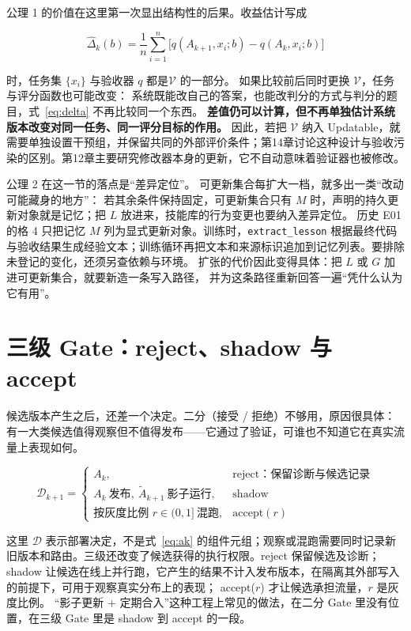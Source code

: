 公理 1 的价值在这里第一次显出结构性的后果。收益估计写成

\begin{equation}
\widehat\Delta_k(b)=\frac{1}{n}\sum_{i=1}^{n}\bigl[q(A_{k+1},x_i;b)-q(A_k,x_i;b)\bigr]
\label{eq:delta}
\end{equation}

时，任务集 $\{x_i\}$ 与验收器 $q$ 都是$\mathcal V$ 的一部分。
如果比较前后同时更换 $\mathcal V$，任务与评分函数也可能改变：
系统既能改自己的答案，也能改判分的方式与判分的题目，式~\eqref{eq:delta} 不再比较同一个东西。
\textbf{差值仍可以计算，但不再单独估计系统版本改变对同一任务、同一评分目标的作用。}
因此，若把 $\mathcal V$ 纳入 Updatable，就需要单独设置干预组，并保留共同的外部评价条件；第14章讨论这种设计与验收污染的区别。第12章主要研究修改器本身的更新，它不自动意味着验证器也被修改。

公理 2 在这一节的落点是“差异定位”。
可更新集合每扩大一档，就多出一类“改动可能藏身的地方”：
若其余条件保持固定，可更新集合只有 $M$ 时，声明的持久更新对象就是记忆；把 $L$ 放进来，技能库的行为变更也要纳入差异定位。
历史 E01 的格 4 只把记忆 $M$ 列为显式更新对象。训练时，\texttt{extract\_lesson} 根据最终代码与验收结果生成经验文本；训练循环再把文本和来源标识追加到记忆列表。要排除未登记的变化，还须另查依赖与环境。
扩张的代价因此变得具体：把 $L$ 或 $G$ 加进可更新集合，就要新造一条写入路径，
并为这条路径重新回答一遍“凭什么认为它有用”。

\section{三级 Gate：reject、shadow 与 accept}
\label{sec:ch02-gate}

候选版本产生之后，还差一个决定。二分（接受 / 拒绝）不够用，原因很具体：
有一大类候选值得观察但不值得发布——它通过了验证，可谁也不知道它在真实流量上表现如何。

\begin{equation}
\mathcal D_{k+1}=\begin{cases}
A_k, & \text{reject：保留诊断与候选记录}\\[2pt]
A_k\ \text{发布},\ \widetilde A_{k+1}\ \text{影子运行}, & \text{shadow}\\[2pt]
\text{按灰度比例 } r\in(0,1]\ \text{混跑}, & \text{accept}(r)
\end{cases}
\label{eq:gate}
\end{equation}

这里 $\mathcal D$ 表示部署决定，不是式~\eqref{eq:ak} 的组件元组；观察或混跑需要同时记录新旧版本和路由。三级还改变了候选获得的执行权限。reject 保留候选及诊断；
shadow 让候选在线上并行跑，它产生的结果不计入发布版本，在隔离其外部写入的前提下，可用于观察真实分布上的表现；
accept($r$) 才让候选承担流量，$r$ 是灰度比例。
“影子更新 + 定期合入”这种工程上常见的做法，在二分 Gate 里没有位置，在三级 Gate 里是 shadow 到 accept 的一段。

